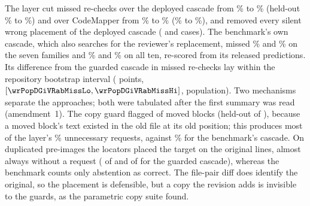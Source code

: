 The layer cut missed re-checks over the deployed cascade from \wrPopDepMiss\% to \wrPopGiMiss\% (held-out \wrHardDepMiss\% to \wrHardGiMiss\%) and over CodeMapper from \wrPopCmQMiss\% to \wrPopCmGiMiss\% (\wrHardCmQMiss\% to \wrHardCmGiMiss\%), and removed every silent wrong placement of the deployed cascade (\wrPopDepSilentK{} and \wrHardDepSilentK{} cases). The benchmark's own cascade, which also searches for the reviewer's replacement, missed \wrPopRabMiss\% and \wrHardRabMiss\% on the seven families and \wrPopRabTenMiss\% and \wrHardRabTenMiss\% on all ten, re-scored from its released predictions. Its difference from the guarded cascade in missed re-checks lay within the repository bootstrap interval (\wrPopDGiVRabMiss{} points, $[\wrPopDGiVRabMissLo, \wrPopDGiVRabMissHi]$, population). Two mechanisms separate the approaches; both were tabulated after the first summary was read (amendment~1). The copy guard flagged \wrPopGiMoveCopyReq{} of \wrPopGiMoveN{} moved blocks (held-out \wrHardGiMoveCopyReq{} of \wrHardGiMoveN), because a moved block's text existed in the old file at its old position; this produces most of the layer's \wrPopGiExtra\% unnecessary requests, against \wrPopRabExtra\% for the benchmark's cascade. On duplicated pre-images the locators placed the target on the original lines, almost always without a request (\wrPopGiDupOrig{} of \wrPopAnchors{} and \wrHardGiDupOrig{} of \wrHardAnchors{} for the guarded cascade), whereas the benchmark counts only abstention as correct. The file-pair diff does identify the original, so the placement is defensible, but a copy the revision adds is invisible to the guards, as the parametric copy suite found.

